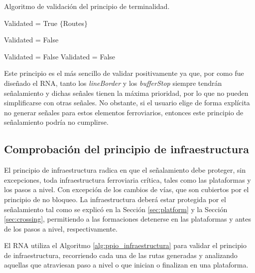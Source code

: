 		\begin{algorithm}[H]
			\caption{Algoritmo de validación del principio de terminalidad.}\label{alg:ppio_terminalidad}
			\DontPrintSemicolon
			\SetNoFillComment
			\LinesNotNumbered 
			Validated = True\;
			$\{$Routes$\}$\; 
			{
				{
					{
						Validated = False\;
					}
				}
				
				{
					{
						Validated = False\;
					}
					{
						Validated = False\;
					}
				}
			}
			
		\end{algorithm}
		
		Este principio es el más sencillo de validar positivamente ya que, por como fue diseñado el RNA, tanto los \textit{lineBorder} y los \textit{bufferStop} siempre tendrán señalamiento y dichas señales tienen la máxima prioridad, por lo que no pueden simplificarse con otras señales. No obstante, si el usuario elige de forma explícita no generar señales para estos elementos ferroviarios, entonces este principio de señalamiento podría no cumplirse.		
				
	\subsection{Comprobación del principio de infraestructura}
		
		El principio de infraestructura radica en que el señalamiento debe proteger, sin excepciones, toda infraestructura ferroviaria crítica, tales como las plataformas y los pasos a nivel. Con excepción de los cambios de vías, que son cubiertos por el principio de no bloqueo. La infraestructura deberá estar protegida por el señalamiento tal como se explicó en la Sección \ref{sec:platform} y la Sección \ref{sec:crossing}, permitiendo a las formaciones detenerse en las plataformas y antes de los pasos a nivel, respectivamente.

		El RNA utiliza el Algoritmo \ref{alg:ppio_infraestructura} para validar el principio de infraestructura, recorriendo cada una de las rutas generadas y analizando aquellas que atraviesan paso a nivel o que inician o finalizan en una plataforma. 
		
